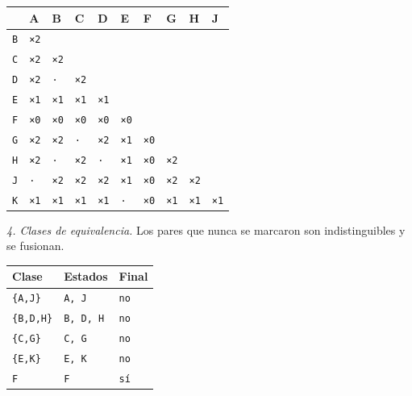 \documentclass[11pt]{article}
\begin{document}
\begin{center}\footnotesize\begin{tabular}{llllllllll}\toprule
 & A & B & C & D & E & F & G & H & J \\\midrule
\texttt{B} & \texttt{×2} & \texttt{} & \texttt{} & \texttt{} & \texttt{} & \texttt{} & \texttt{} & \texttt{} & \texttt{} \\
\texttt{C} & \texttt{×2} & \texttt{×2} & \texttt{} & \texttt{} & \texttt{} & \texttt{} & \texttt{} & \texttt{} & \texttt{} \\
\texttt{D} & \texttt{×2} & \texttt{·} & \texttt{×2} & \texttt{} & \texttt{} & \texttt{} & \texttt{} & \texttt{} & \texttt{} \\
\texttt{E} & \texttt{×1} & \texttt{×1} & \texttt{×1} & \texttt{×1} & \texttt{} & \texttt{} & \texttt{} & \texttt{} & \texttt{} \\
\texttt{F} & \texttt{×0} & \texttt{×0} & \texttt{×0} & \texttt{×0} & \texttt{×0} & \texttt{} & \texttt{} & \texttt{} & \texttt{} \\
\texttt{G} & \texttt{×2} & \texttt{×2} & \texttt{·} & \texttt{×2} & \texttt{×1} & \texttt{×0} & \texttt{} & \texttt{} & \texttt{} \\
\texttt{H} & \texttt{×2} & \texttt{·} & \texttt{×2} & \texttt{·} & \texttt{×1} & \texttt{×0} & \texttt{×2} & \texttt{} & \texttt{} \\
\texttt{J} & \texttt{·} & \texttt{×2} & \texttt{×2} & \texttt{×2} & \texttt{×1} & \texttt{×0} & \texttt{×2} & \texttt{×2} & \texttt{} \\
\texttt{K} & \texttt{×1} & \texttt{×1} & \texttt{×1} & \texttt{×1} & \texttt{·} & \texttt{×0} & \texttt{×1} & \texttt{×1} & \texttt{×1} \\
\bottomrule\end{tabular}\end{center}
\textit{4. Clases de equivalencia.} Los pares que nunca se marcaron son indistinguibles y se fusionan.
\begin{center}\footnotesize\begin{tabular}{lll}\toprule
Clase & Estados & Final \\\midrule
\texttt{\{A,J\}} & \texttt{A, J} & \texttt{no} \\
\texttt{\{B,D,H\}} & \texttt{B, D, H} & \texttt{no} \\
\texttt{\{C,G\}} & \texttt{C, G} & \texttt{no} \\
\texttt{\{E,K\}} & \texttt{E, K} & \texttt{no} \\
\texttt{F} & \texttt{F} & \texttt{sí} \\
\bottomrule\end{tabular}\end{center}
\end{document}

